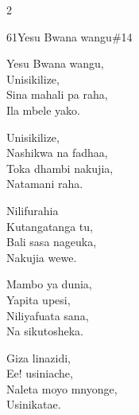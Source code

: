 \begin{multicols}{2}
\begin{hymn}{61}{Yesu Bwana wangu}{\#14}
\begin{stanza}
Yesu Bwana wangu,\\
Unisikilize,\\
Sina mahali pa raha,\\
Ila mbele yako.
\end{stanza}
\begin{stanza}
Unisikilize,\\
Nashikwa na fadhaa,\\
Toka dhambi nakujia,\\
Natamani raha.
\end{stanza}
\begin{stanza}
Nilifurahia\\
Kutangatanga tu,\\
Bali sasa nageuka,\\
Nakujia wewe.
\end{stanza}
\begin{stanza}
Mambo ya dunia,\\
Yapita upesi,\\
Niliyafuata sana,\\
Na sikutosheka.
\end{stanza}
\begin{stanza}
Giza linazidi,\\
Ee! usiniache,\\
Naleta moyo mnyonge,\\
Usinikatae.
\end{stanza}
\end{hymn}


\end{multicols}
